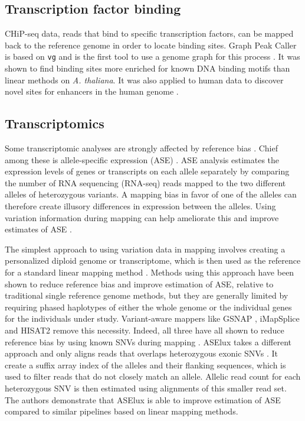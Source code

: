\subsection{Transcription factor binding}

CHiP-seq data, reads that bind to specific transcription factors, can be mapped back to the reference genome in order to locate binding sites.
Graph Peak Caller is based on \texttt{vg} and is the first tool to use a genome graph for this process \cite{Grytten_2019}.
It was shown to find binding sites more enriched for known DNA binding motifs than linear methods on \emph{A. thaliana}.
It was also applied to human data to discover novel sites for enhancers in the human genome \cite{groza2019personalized}. 


\subsection{Transcriptomics}

Some transcriptomic analyses are strongly affected by reference bias \cite{Degner2009-vw,stevenson2013sources}.
Chief among these is allele-specific expression (ASE) \cite{Castel2015-ef}.
ASE analysis estimates the expression levels of genes or transcripts on each allele separately by comparing the number of RNA sequencing (RNA-seq) reads mapped to the two different alleles of heterozygous variants.
A mapping bias in favor of one of the alleles can therefore create illusory differences in expression between the alleles.
Using variation information during mapping can help ameliorate this and improve estimates of ASE \cite{Castel2015-ef,Miao2018-ps}.

The simplest approach to using variation data in mapping involves creating a personalized diploid genome or transcriptome, which is then used as the reference for a standard linear mapping method \cite{Turro2011-op,Rozowsky_2011,Bray_2016,Raghupathy2018-sd}.
Methods using this approach have been shown to reduce reference bias and improve estimation of ASE, relative to traditional single reference genome methods, but they are generally limited by requiring phased haplotypes of either the whole genome or the individual genes for the individuals under study.
Variant-aware mappers like GSNAP \cite{Wu2010-hv}, iMapSplice \cite{Liu_2018} and HISAT2 \cite{Kim_2019} remove this necessity.
Indeed, all three have all shown to reduce reference bias by using known SNVs during mapping \cite{Castel2015-ef,Liu_2018}.
ASElux takes a different approach and only aligns reads that overlaps heterozygous exonic SNVs \cite{Miao2018-ps}.
It create a suffix array index of the alleles and their flanking sequences, which is used to filter reads that do not closely match an allele.
Allelic read count for each heterozygous SNV is then estimated using alignments of this smaller read set.
The authors demonstrate that ASElux is able to improve estimation of ASE compared to similar pipelines based on linear mapping methods.

